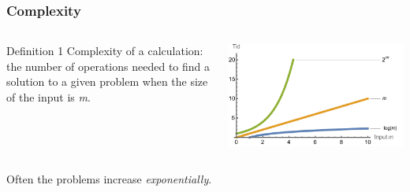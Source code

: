 \documentclass[10pt]{beamer}
\begin{document}
\begin{frame}
  \frametitle{Complexity}
  \begin{columns}
    \begin{column}{0.5\linewidth}
      \begin{block}{Definition 1}
       Complexity of a calculation: the number of operations needed to find a solution to a given problem when the size of the input is \emph{m}. 
      \end{block}
    \end{column}
    \begin{column}{0.5\linewidth}

      \includegraphics[width=\linewidth]{img/Complexity.pdf}
    \end{column}
  \end{columns}
   \Large Often the problems increase \emph{exponentially}.
\end{frame}
\end{document}
